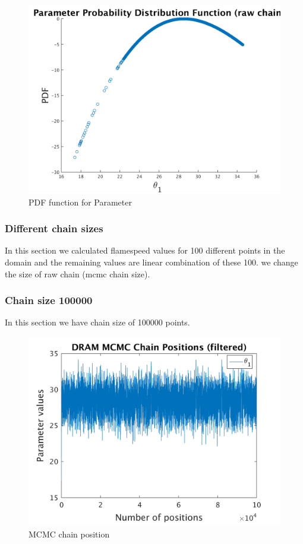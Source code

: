 \begin{figure}[H]
  
  \centering
   \includegraphics[scale=0.75]{53_results/output_1000/ip_logLike_unified}
   \caption{PDF function for Parameter }
\end{figure}


\subsubsection{Different chain sizes }

In this section we calculated flamespeed values for 100 different points in the domain and the remaining values are linear combination of these 100. we change the size of raw chain (mcmc chain size). 

\subsubsection{Chain size 100000 }

In this section we have chain size of 100000 points. 

\begin{figure}[H]
  
  \centering
   \includegraphics[scale=0.75]{53_results/output_100000/simple_ip_chain_pos_filt}
   \caption{MCMC chain position }
\end{figure}


